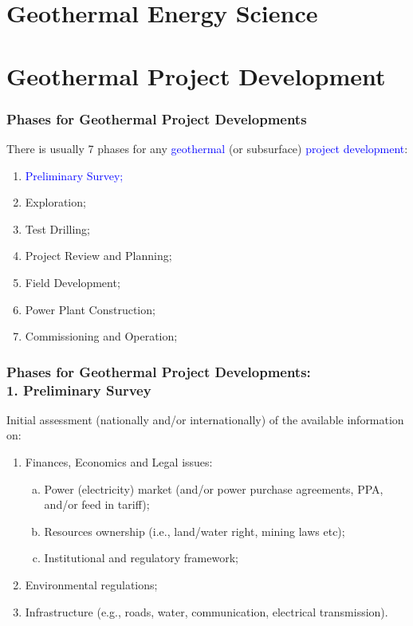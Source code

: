 \documentclass[10pt,compress]{beamer}
\newcommand{\blue}{\textcolor{blue}}
\begin{document}
 \section{Geothermal Energy Science}






 \section{Geothermal Project Development} %

\begin{frame}
 \frametitle{Phases for Geothermal Project Developments} 
    There is usually 7 phases for any \blue{geothermal} (or subsurface) \blue{project development}: 
    \begin{enumerate}[1.]
       \item <1-> \blue{Preliminary Survey;}
       \item <1-> Exploration; 
       \item <1-> Test Drilling;
       \item <1-> Project Review and Planning;
       \item <1-> Field Development; 
       \item <1-> Power Plant Construction;
       \item <1-> Commissioning and Operation;
    \end{enumerate}
\end{frame}

\begin{frame}
 \frametitle{Phases for Geothermal Project Developments: \\1. Preliminary Survey} 

    Initial assessment (nationally and/or internationally) of the available information on:
    \begin{enumerate}[{1.}1]
       \item <1-> Finances, Economics and Legal issues:
          \begin{enumerate}[(a)]
             \item<2-> Power (electricity) market (and/or power purchase agreements, PPA, and/or feed in tariff);
             \item<2-> Resources ownership (i.e., land/water right, mining laws etc);
             \item<2-> Institutional and regulatory framework;
          \end{enumerate}
       \item <3-> Environmental regulations; 
       \item <4-> Infrastructure (e.g., roads, water, communication, electrical transmission).
    \end{enumerate}
\end{frame}
\end{document}
